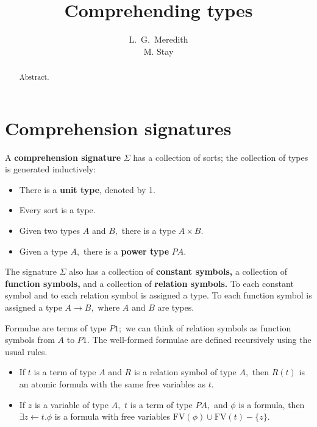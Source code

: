 \documentclass{article}
\begin{document}
\title{Comprehending types}
\author{L.\ G.\ Meredith \\ M. Stay}

\maketitle

\begin{abstract}
Abstract.
\end{abstract}

\section{Comprehension signatures}
A {\bf comprehension signature} $\Sigma$ has a collection of sorts; the collection of types is generated inductively:
\begin{itemize}
  \item There is a {\bf unit type}, denoted by 1.
  \item Every sort is a type.
  \item Given two types $A$ and $B,$ there is a type $A\times B.$
  \item Given a type $A,$ there is a {\bf power type} $PA.$
\end{itemize}

The signature $\Sigma$ also has a collection of {\bf constant symbols,} a collection of {\bf function symbols,} and a collection of {\bf relation symbols.}  To each constant symbol and to each relation symbol is assigned a type.  To each function symbol is assigned a type $A\to B,$ where $A$ and $B$ are types.

Formulae are terms of type $P1;$ we can think of relation symbols as function symbols from $A$ to $P1.$  The well-formed formulae are defined recursively using the usual rules. 
\begin{itemize}
  \item If $t$ is a term of type $A$ and $R$ is a relation symbol of type $A,$ then $R(t)$ is an atomic formula with the same free variables as $t.$
  \item If $z$ is a variable of type $A,$ $t$ is a term of type $PA,$ and $\phi$ is a formula, then $\exists z\leftarrow t.\phi$ is a formula with free variables $\mbox{FV}(\phi) \cup \mbox{FV}(t) - \{ z \}.$
\end{itemize}
\end{document}
